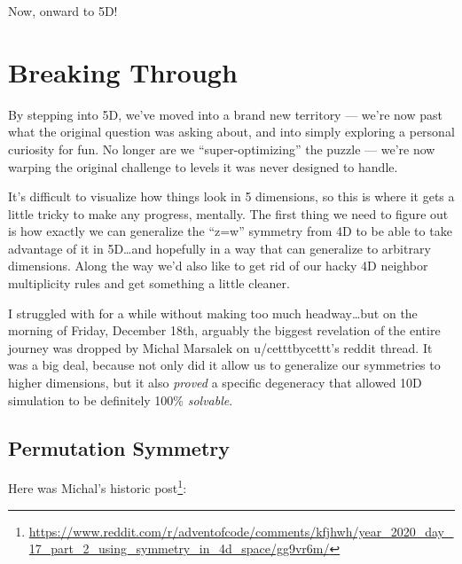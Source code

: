 \documentclass[]{article}
\renewcommand{\href}[2]{#2\footnote{\url{#1}}}
\begin{document}
Now, onward to 5D!

\hypertarget{breaking-through}{%
\section{Breaking Through}\label{breaking-through}}

By stepping into 5D, we've moved into a brand new territory --- we're now past
what the original question was asking about, and into simply exploring a
personal curiosity for fun. No longer are we ``super-optimizing'' the puzzle ---
we're now warping the original challenge to levels it was never designed to
handle.

It's difficult to visualize how things look in 5 dimensions, so this is where it
gets a little tricky to make any progress, mentally. The first thing we need to
figure out is how exactly we can generalize the ``z=w'' symmetry from 4D to be
able to take advantage of it in 5D\ldots and hopefully in a way that can
generalize to arbitrary dimensions. Along the way we'd also like to get rid of
our hacky 4D neighbor multiplicity rules and get something a little cleaner.

I struggled with for a while without making too much headway\ldots but on the
morning of Friday, December 18th, arguably the biggest revelation of the entire
journey was dropped by Michal Marsalek on u/cetttbycettt's reddit thread. It was
a big deal, because not only did it allow us to generalize our symmetries to
higher dimensions, but it also \emph{proved} a specific degeneracy that allowed
10D simulation to be definitely 100\% \emph{solvable}.

\hypertarget{permutation-symmetry}{%
\subsection{Permutation Symmetry}\label{permutation-symmetry}}

Here was Michal's
\href{https://www.reddit.com/r/adventofcode/comments/kfjhwh/year_2020_day_17_part_2_using_symmetry_in_4d_space/gg9vr6m/}{historic
post}:
\end{document}

